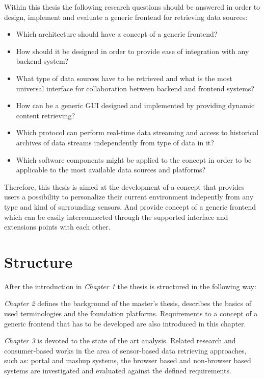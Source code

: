        Within this thesis the following research questions should be answered in order to design, implement and evaluate a generic frontend for retrieving data sources: 
       \begin{itemize}
       \item Which architecture should have a concept of a generic frontend?
       \item How should it be designed in order to provide ease of integration with any backend system?
       \item What type of data sources have to be retrieved and what is the most universal interface for collaboration between backend and frontend systems?
       \item How can be a generic GUI designed and implemented by providing dynamic content retrieving?
       \item Which protocol can perform real-time data streaming and access to historical archives of data streams independently from type of data in it?
       \item Which software components might be applied to the concept in order to be applicable to the most available data sources and platforms?
       \end{itemize}

     Therefore, this thesis is aimed at the development of a concept that provides users a possibility to personalize their current environment indepently from any type and kind of surrounding sensors. And provide concept of a generic frontend which can be easily interconnected through the supported interface and extensions points with each other.

\section{Structure}

After the introduction in \emph{Chapter 1} the thesis is structured in the following way:

\emph{Chapter 2} defines the background of the master's thesis, describes the basics of used terminologies and the foundation platforms. Requirements to a concept of a generic frontend that has to be developed are also introduced in this chapter.

\emph{Chapter 3} is devoted to the state of the art analysis. Related research and consumer-based works in the area of sensor-based data retrieving approaches, such as: portal and mashup systems, the browser based and non-browser based systems are investigated and evaluated against the defined requirements.

